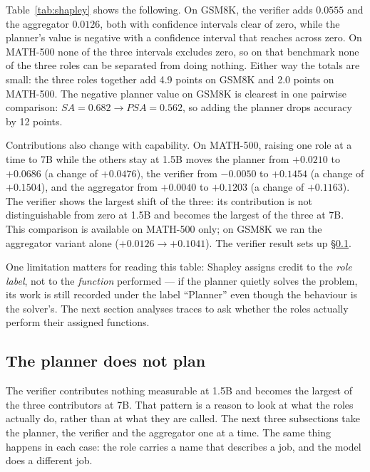 \documentclass[11pt,a4paper]{article}
\begin{document}
Table~\ref{tab:shapley} shows the following. On GSM8K, the verifier adds $0.0555$ and the aggregator $0.0126$, both with confidence intervals clear of zero, while the planner's value is negative with a confidence interval that reaches across zero. On MATH-500 none of the three intervals excludes zero, so on that benchmark none of the three roles can be separated from doing nothing. Either way the totals are small: the three roles together add 4.9 points on GSM8K and 2.0 points on MATH-500. The negative planner value on GSM8K is clearest in one pairwise comparison: $SA = 0.682 \to PSA = 0.562$, so adding the planner drops accuracy by 12 points.

Contributions also change with capability. On MATH-500, raising one role at a time to 7B while the others stay at 1.5B moves the planner from $+0.0210$ to $+0.0686$ (a change of $+0.0476$), the verifier from $-0.0050$ to $+0.1454$ (a change of $+0.1504$), and the aggregator from $+0.0040$ to $+0.1203$ (a change of $+0.1163$). The verifier shows the largest shift of the three: its contribution is not distinguishable from zero at 1.5B and becomes the largest of the three at 7B. This comparison is available on MATH-500 only; on GSM8K we ran the aggregator variant alone ($+0.0126 \to +0.1041$). The verifier result sets up \S\ref{sec:roles}.

One limitation matters for reading this table: Shapley assigns credit to the \emph{role label}, not to the \emph{function} performed --- if the planner quietly solves the problem, its work is still recorded under the label ``Planner'' even though the behaviour is the solver's. The next section analyses traces to ask whether the roles actually perform their assigned functions.

\subsection{The planner does not plan}\label{sec:roles}

The verifier contributes nothing measurable at 1.5B and becomes the largest of the three contributors at 7B. That pattern is a reason to look at what the roles actually do, rather than at what they are called. The next three subsections take the planner, the verifier and the aggregator one at a time. The same thing happens in each case: the role carries a name that describes a job, and the model does a different job.
\end{document}

